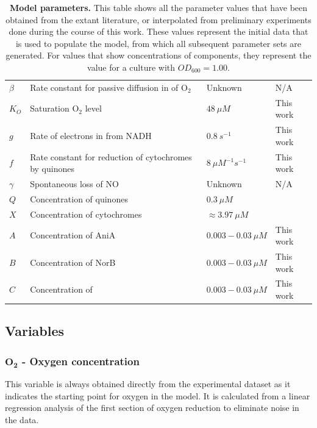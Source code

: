 \begin{table}[tbp]
\begin{center}
\begin{tabular}{>{\centering}m{1.7cm}>{\centering}m{6.2cm}>{\centering}m{2.5cm}>{\centering}m{2.8cm}}
$\beta$ & Rate constant for passive diffusion in of O$_{\textrm{2}}$ & Unknown & N/A
\tabularnewline\noalign{\smallskip}\hline\noalign{\smallskip}

$K_O$ & Saturation O$_{\textrm{2}}$ level & $48~\mu M$ & This work
\tabularnewline\noalign{\smallskip}\hline\noalign{\smallskip}

$g$ & Rate of electrons in from NADH & $0.8~s^{-1}$ & This work
\tabularnewline\noalign{\smallskip}\hline\noalign{\smallskip}

$f$ & Rate constant for reduction of cytochromes by quinones & $8~\mu M^{-1}s^{-1}$ & This work
\tabularnewline\noalign{\smallskip}\hline\noalign{\smallskip}

$\gamma$ & Spontaneous loss of NO & Unknown & N/A
\tabularnewline\noalign{\smallskip}\hline\noalign{\smallskip}

$Q$ & Concentration of quinones & $0.3~\mu M$ & \citet{Hedrick1986}
\tabularnewline\noalign{\smallskip}\hline\noalign{\smallskip}

$X$ & Concentration of cytochromes & $\approx3.97~\mu M$ & \citet{Deeudom2007}
\tabularnewline\noalign{\smallskip}\hline\noalign{\smallskip}

$A$ & Concentration of AniA & $0.003 - 0.03~\mu M$ & This work
\tabularnewline\noalign{\smallskip}\hline\noalign{\smallskip}

$B$ & Concentration of NorB & $0.003 - 0.03~\mu M$ & This work
\tabularnewline\noalign{\smallskip}\hline\noalign{\smallskip}

$C$ & Concentration of \cbbthree{} & $0.003 - 0.03~\mu M$ & This work
\tabularnewline
\bottomrule
\end{tabular}
\caption[Model parameters]{{\bf Model parameters.} This table shows all the parameter values that have been obtained from the extant literature, or interpolated from preliminary experiments done during the course of this work. These values represent the initial data that is used to populate the model, from which all subsequent parameter sets are generated. For values that show concentrations of components, they represent the value for a culture with $OD_{600}=1.00$.
\label{tab:ps}}
\end{center}
\end{table}

\subsection*{Variables}
\subsubsection*{$\mathbf{O_2}$ {\bf- Oxygen concentration}}
This variable is always obtained directly from the experimental dataset as it indicates the starting point for oxygen in the model. It is calculated from a linear regression analysis of the first section of oxygen reduction to eliminate noise in the data.

